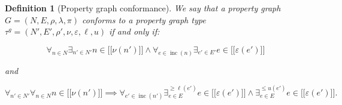 \documentclass[a4paper]{article}
\newtheorem{definition}[theorem]{Definition}
\newcommand{\gtype}{\tau^g}
\newcommand{\lsem}{\ensuremath{[\![}}
\newcommand{\rsem}{\ensuremath{]\!]}}
\newcommand{\sem}[1]{\ensuremath{\lsem #1 \rsem}}
\DeclareMathOperator{\inc}{inc}
\begin{document}
\begin{definition}[Property graph conformance]
  We say that a property graph $G = (N, E, \rho, \lambda, \pi)$ \emph{conforms} to a property graph type $\gtype = (N', E', \rho', \nu, \varepsilon, \ell, u)$ if and only if:

  $$\forall_{n \in N} \exists_{n' \in N'} n \in \sem{\nu(n')} \wedge \forall_{e \in \inc(n)} \exists_{e' \in E'} e \in \sem{\varepsilon(e')}$$

  and


  $$\forall_{n' \in N'} \forall_{n \in N} n \in \sem{\nu(n')} \implies \forall_{e' \in \inc(n')} \exists^{\geq \ell(e')}_{e \in E} e \in \sem{\varepsilon(e')} \wedge \exists^{\leq u(e')}_{e \in E} e \in \sem{\varepsilon(e')}.$$
\end{definition}
\end{document}
